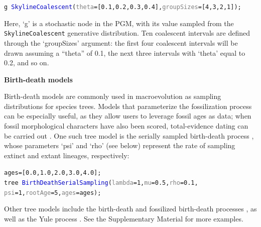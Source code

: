 \documentclass[10pt,letterpaper,table]{article}
\begin{document}
{\small
  \begin{alltt}
    \textcolor{bluishgreen}{g} ~ \textcolor{blue}{SkylineCoalescent}(\textcolor{gray}{theta}=[\textcolor{constant}{0.1}, \textcolor{constant}{0.2}, \textcolor{constant}{0.3}, \textcolor{constant}{0.4}], \textcolor{gray}{groupSizes}=[\textcolor{constant}{4},\textcolor{constant}{3},\textcolor{constant}{2},\textcolor{constant}{1}]);
  \end{alltt}
}

Here, `g' is a stochastic node in the PGM, with its value sampled from the \texttt{SkylineCoalescent} generative distribution. Ten coalescent intervals are defined through the `groupSizes' argument: the first four coalescent intervals will be drawn assuming a ``theta'' of 0.1, the next three intervals with `theta' equal to 0.2, and so on.
\newline

\noindent \textbf{Birth-death models}

Birth-death models are commonly used in macroevolution as sampling distributions for species trees. Models that parameterize the fossilization process can be especially useful, as they allow users to leverage fossil ages as data; when fossil morphological characters have also been scored, total-evidence dating can be carried out \cite{ogilvie21}. One such tree model is the serially sampled birth-death process \cite{stadler2013dating}, whose parameters `psi' and `rho' (see below) represent the rate of sampling extinct and extant lineages, respectively:

{\small
  \begin{alltt}
    ages = [\textcolor{constant}{0.0}, \textcolor{constant}{1.0}, \textcolor{constant}{2.0}, \textcolor{constant}{3.0}, \textcolor{constant}{4.0}];
    \textcolor{bluishgreen}{tree} ~ \textcolor{blue}{BirthDeathSerialSampling}(\textcolor{gray}{lambda}=1, \textcolor{gray}{mu}=\textcolor{constant}{0.5}, \textcolor{gray}{rho}=\textcolor{constant}{0.1},
    \textcolor{gray}{psi}=\textcolor{constant}{1}, \textcolor{gray}{rootAge}=\textcolor{constant}{5}, \textcolor{gray}{ages}=ages);
  \end{alltt}
}

Other tree models include the birth-death \cite{kendall1948generalized} and fossilized birth-death processes \cite{heath2014fossilized}, as well as the Yule process \cite{yule1925ii}. See the Supplementary Material for more examples.
\end{document}
